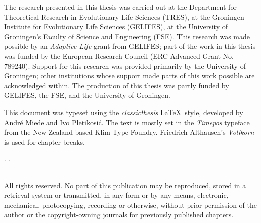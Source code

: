 \thispagestyle{empty}

\hfill

\vfill


\noindent The research presented in this thesis was carried out at the Department for Theoretical Research in Evolutionary Life Sciences (TRES), at the Groningen Institute for Evolutionary Life Sciences (GELIFES), at the University of Groningen's Faculty of Science and Engineering (FSE).
This research was made possible by an \emph{Adaptive Life} grant from GELIFES; part of the work in this thesis was funded by the European Research Council (ERC Advanced Grant No. 789240).
Support for this research was provided primarily by the University of Groningen; other institutions whose support made parts of this work possible are acknowledged within.
The production of this thesis was partly funded by GELIFES, the FSE, and the University of Groningen.

\medskip

\noindent This document was typeset using the \emph{classicthesis} \LaTeX~style, developed by Andr\'e Miede and Ivo Pletikosić.
The text is mostly set in the \emph{Timepos} typeface from the New Zealand-based Klim Type Foundry. Friedrich Althausen's \emph{Vollkorn} is used for chapter breaks.

\bigskip

\noindent\finalVersionString

\noindent\myName. \textit{\myTitle.}%
\\
\noindent \textcopyright\ \year

All rights reserved. No part of this publication may be reproduced, stored in a retrieval system or transmitted, in any form or by any means, electronic, mechanical, photocopying, recording or otherwise, without prior permission of the author or the copyright-owning journals for previously published chapters.
